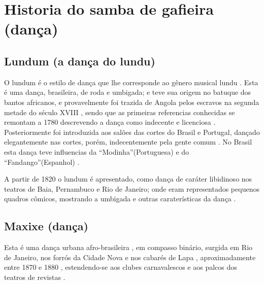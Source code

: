 

\chapter{Historia do samba de gafieira  (dança)}
\label{cap:sambagafieira}


\section{Lundum (a dança do lundu)} 
\label{sec:lundu}
O lundum é o estilo de dança que lhe corresponde ao gênero musical lundu \cite[pp. 18]{perna2002samba}.
Esta é uma dança, brasileira, de roda e umbigada; e teve sua origem no batuque dos bantos africanos,
e provavelmente foi trazida de Angola pelos escravos na segunda metade do século XVIII 
\cite[pp. 48]{tinhorao1986pequena} \cite[pp. 188]{dourado2004dicionario},
sendo que as primeiras referencias conhecidas se remontam a 1780 
descrevendo a dança como indecente e licenciosa \cite[pp. 51]{tinhorao1986pequena} \cite[pp. 19]{perna2002samba}.
Posteriormente foi introduzida aos salões das cortes do Brasil e Portugal, 
dançado elegantemente nas cortes, porém, indecentemente pela gente comum   
\cite[pp. 19]{perna2002samba} \cite[pp. 188]{dourado2004dicionario}.
No Brasil esta dança teve influencias da ``Modinha''(Portuguesa) e do ``Fandango''(Espanhol) \cite[pp. 188]{dourado2004dicionario}.

A partir de 1820 o lundum é apresentado, como dança de caráter libidinoso nos teatros de Baia, Pernambuco e Rio de Janeiro;
onde eram representados pequenos quadros cômicos, 
mostrando a umbigada e outras caraterísticas da dança \cite[pp. 19]{perna2002samba}.


\section{Maxixe (dança)}
\label{sec:maxixe}
Esta é uma dança urbana afro-brasileira \cite[pp. 4]{musicasambavariasdef1}, 
em compasso binário, surgida em Rio de Janeiro, 
nos forrós da Cidade Nova e nos cabarés de Lapa \cite[pp. 465]{marcondes1977enciclopedia}  \cite[pp. 198]{dourado2004dicionario}, 
aproximadamente entre 1870 e 1880 
\cite[pp. 58]{tinhorao1986pequena} \cite[pp. 465]{marcondes1977enciclopedia}  \cite[pp. 62]{reinato2010musica},
estendendo-se  aos clubes carnavalescos e aos palcos dos teatros de revistas \cite[pp. 465]{marcondes1977enciclopedia}.

